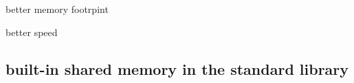 \documentclass[14pt, usenames,dvipsnames]{beamer} %
\begin{document}
    \begin{frame}[t]{better memory footrpint}
    \end{frame}

    \begin{frame}[t]{better speed}
    \end{frame}
\subsection{built-in shared memory in the standard library}



\begin{frame}[fragile]{}
    \begin{beamerboxesrounded}{}
        \inputminted[fontfamily=fvm, bgcolor=beige]{python}{scripts/test_script.py}
    \end{beamerboxesrounded}
\end{frame}
\end{document}
